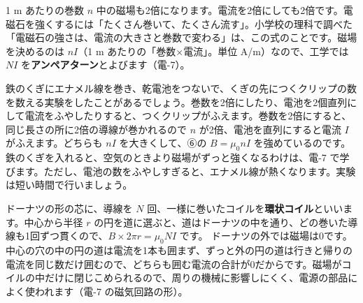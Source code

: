 \begin{phflow}[電流がつくる磁場]
\end{phflow}

\begin{phbaisuru}{1 m あたりの巻数 $n$}
中の磁場も2倍になります。電流を2倍にしても2倍です。電磁石を強くするには「たくさん巻いて、たくさん流す」。小学校の理科で調べた「電磁石の強さは、電流の大きさと巻数で変わる」は、この式のことです。磁場を決めるのは $nI$（1 m あたりの「巻数×電流」。単位 A/m）なので、工学では $NI$ を\textbf{アンペアターン}とよびます（電-7）。
\end{phbaisuru}

\begin{phmijika}
鉄のくぎにエナメル線を巻き、乾電池をつないで、くぎの先につくクリップの数を数える実験をしたことがあるでしょう。巻数を2倍にしたり、電池を2個直列にして電流をふやしたりすると、つくクリップがふえます。巻数を2倍にすると、同じ長さの所に2倍の導線が巻かれるので $n$ が2倍、電池を直列にすると電流 $I$ がふえます。どちらも $nI$ を大きくして、⑥の $B=\mu_0nI$ を強めているのです。鉄のくぎを入れると、空気のときより磁場がずっと強くなるわけは、電-7 で学びます。ただし、電池の数をふやしすぎると、エナメル線が熱くなります。実験は短い時間で行いましょう。
\end{phmijika}

ドーナツの形の芯に、導線を $N$ 回、一様に巻いたコイルを\textbf{環状コイル}といいます。中心から半径 $r$ の円を道に選ぶと、道はドーナツの中を通り、どの巻いた導線も1回ずつ貫くので、$B\times2\pi r=\mu_0NI$ です。
ドーナツの外では磁場は0です。中心の穴の中の円の道は電流を1本も囲まず、ずっと外の円の道は行きと帰りの電流を同じ数だけ囲むので、どちらも囲む電流の合計が0だからです。磁場がコイルの中だけに閉じこめられるので、周りの機械に影響しにくく、電源の部品によく使われます（電-7 の磁気回路の形）。

